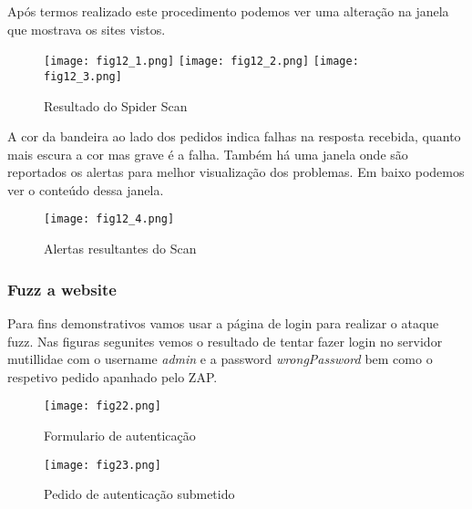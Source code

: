 Após termos realizado este procedimento podemos ver uma alteração na janela que mostrava os sites vistos.
\begin{figure}[H]

  \centering

  \texttt{[image: fig12\_1.png]}
  \texttt{[image: fig12\_2.png]}
  \texttt{[image: fig12\_3.png]}

  \caption{Resultado do Spider Scan}

\end{figure}


A cor da bandeira ao lado dos pedidos indica falhas na resposta recebida, quanto mais escura a cor mas grave é a falha.
Também há uma janela onde são reportados os alertas para melhor visualização dos problemas. Em baixo podemos ver o conteúdo dessa janela.
\begin{figure}[H]

  \centering

  \texttt{[image: fig12\_4.png]}

  \caption{Alertas resultantes do Scan}

\end{figure}



\subsubsection{Fuzz a website}


Para fins demonstrativos vamos usar a página de login para realizar o ataque fuzz. Nas figuras segunites vemos o resultado de tentar fazer login no servidor mutillidae com o username \textit{admin} e a password \textit{wrongPassword} bem como o respetivo pedido apanhado pelo ZAP.
\begin{figure}[H]

  \centering

  \texttt{[image: fig22.png]}

  \caption{Formulario de autenticação}

\end{figure}
\begin{figure}[H]

  \centering

  \texttt{[image: fig23.png]}

  \caption{Pedido de autenticação submetido}

\end{figure}

